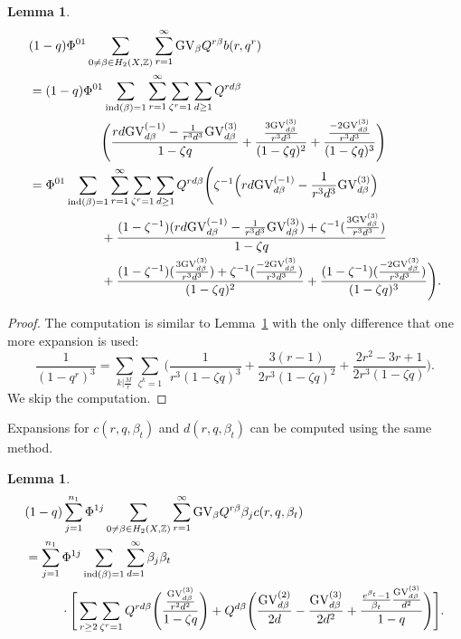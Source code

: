 \documentclass[11pt]{amsart}
\newtheorem{lemma}[theorem]{Lemma}
\newtheorem*{main theorem*}{Main Theorem}
\theoremstyle{remark}
\numberwithin{equation}{section}
\newcommand{\GV}{{\mathrm{GV}}}
\begin{document}
\begin{lemma} \label{lemma_b_expansion}
\[
\begin{split}
    &(1-q)\Phi^{01} \sum_{0\neq \beta \in H_2(X,\mathbb{Z})} \sum_{r=1}^{\infty} \GV_{\beta} Q^{r\beta} b(r,q^r)
    \\
    & =(1-q)\Phi^{01}\sum_{{\rm ind}(\beta)=1} \sum_{r=1}^{\infty} \sum_{\zeta^r=1} \sum_{d\geq 1} Q^{rd\beta} 
    \\
    &\hspace{20mm} \Bigg( \frac{rd \GV^{(-1)}_{d\beta} - \frac{1}{r^3d^3}\GV_{d\beta}^{(3)}}{1-\zeta q} 
     + \frac{ \frac{3\GV_{d\beta}^{(3)}}{r^3d^3} }{(1-\zeta q)^2} + \frac{ \frac{-2\GV_{d\beta}^{(3)}}{r^3d^3} }{(1-\zeta q)^3}  \Bigg)
    \\
    &= \Phi^{01}\sum_{{\rm ind}(\beta)=1} \sum_{r=1}^{\infty} \sum_{\zeta^r=1} \sum_{d\geq 1} Q^{rd\beta} \Bigg( \zeta^{-1} \Big( rd \GV^{(-1)}_{d\beta} - \frac{1}{r^3d^3}\GV_{d\beta}^{(3)} \Big)
    \\
    & \hspace{20mm} + \frac{ (1-\zeta^{-1}) (rd \GV^{(-1)}_{d\beta} - \frac{1}{r^3d^3}\GV_{d\beta}^{(3)}) + \zeta^{-1}( \frac{3\GV_{d\beta}^{(3)}}{r^3d^3} ) }{1-\zeta q} 
    \\
    & \hspace{20mm} + \frac{(1-\zeta^{-1})(\frac{3\GV_{d\beta}^{(3)}}{r^3d^3}) + \zeta^{-1}( \frac{-2\GV_{d\beta}^{(3)}}{r^3d^3} ) }{(1-\zeta q)^2} + \frac{(1-\zeta^{-1})(\frac{-2\GV_{d\beta}^{(3)}}{r^3d^3} )}{(1-\zeta q)^3}\Bigg).
\end{split}
\]
\end{lemma}
\begin{proof}
    The computation is similar to Lemma~\ref{lemma_b_expansion} with the only difference that one more expansion is used:
    \[
    \frac{1}{(1-q^r)^3} = \sum_{k|\frac{M}{r}}\sum_{\zeta^k=1} \Big( \frac{1}{r^3(1-\zeta q)^3} + \frac{3(r-1)}{2r^3(1-\zeta q)^2} + \frac{2r^2-3r+1}{2r^3(1-\zeta q)}   \Big).
    \]
    We skip the computation.
\end{proof}
Expansions for $c(r,q,\beta_t)$ and $d(r,q,\beta_t)$ can be computed using the same method.
\begin{lemma} \label{lemma_c_expansion}
\[
\begin{split}
    &(1-q)\sum_{j=1}^{n_1}\Phi^{1j}\sum_{0\neq \beta \in H_2(X,\mathbb{Z})} \sum_{r=1}^{\infty} \GV_{\beta} Q^{r\beta} \beta_j c(r,q,\beta_t)
    \\
    & = \sum_{j=1}^{n_1}\Phi^{1j} \sum_{{\rm ind}(\beta)=1} \sum_{d=1}^{\infty} \beta_j\beta_t 
    \\
    & \hspace{10mm} \cdot\Bigg[ \sum_{r\geq 2}\sum_{\zeta^r=1} Q^{rd\beta} \Bigg( \frac{ \frac{\GV_{d\beta}^{(3)}}{r^2d^2} }{1-\zeta q} \Bigg) + Q^{d\beta}\Bigg(  \frac{\GV_{d\beta}^{(2)}}{2d} - \frac{\GV_{d\beta}^{(3)}}{2d^2}  + \frac{ \frac{e^{\beta_t}-1}{\beta_t} \frac{\GV_{d\beta}^{(3)}}{d^2} }{1-q} \Bigg)\Bigg].
\end{split}
\]
\end{lemma}
\end{document}
